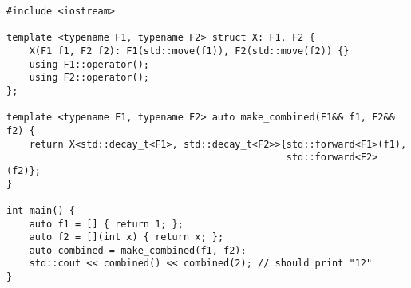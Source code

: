 \begin{lstlisting}[title=\href{https://godbolt.org/z/b7vznr}{\texttt{godbolt.org/z/b7vznr}}]
#include <iostream>

template <typename F1, typename F2> struct X: F1, F2 {
    X(F1 f1, F2 f2): F1(std::move(f1)), F2(std::move(f2)) {}
    using F1::operator();
    using F2::operator();
};

template <typename F1, typename F2> auto make_combined(F1&& f1, F2&& f2) {
    return X<std::decay_t<F1>, std::decay_t<F2>>{std::forward<F1>(f1),
                                                 std::forward<F2>(f2)};
}

int main() {
    auto f1 = [] { return 1; };
    auto f2 = [](int x) { return x; };
    auto combined = make_combined(f1, f2);
    std::cout << combined() << combined(2); // should print "12"
}
\end{lstlisting}
